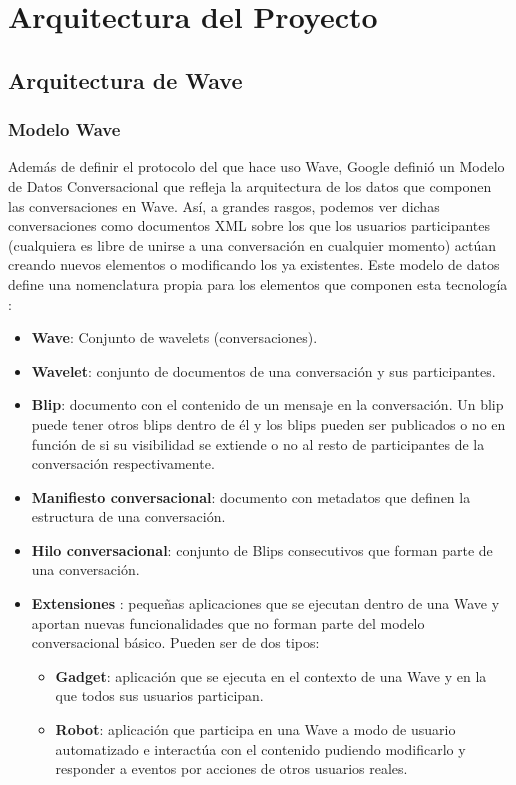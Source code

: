 \newpage
\thispagestyle{sectioned}
\chapter{Arquitectura del Proyecto}

\section{Arquitectura de Wave}

    \subsection{Modelo Wave}\label{sec:waveModel}
    
    Además de definir el protocolo del que hace uso Wave, Google definió un Modelo de Datos Conversacional \cite{ref:wave_conversation_model} que refleja la arquitectura de los datos que componen las conversaciones en Wave. Así, a grandes rasgos, podemos ver dichas conversaciones como documentos XML sobre los que los usuarios participantes (cualquiera es libre de unirse a una conversación en cualquier momento) actúan creando nuevos elementos o modificando los ya existentes. Este modelo de datos define una nomenclatura propia para los elementos que componen esta tecnología \cite{ref:wave_api_overview} \cite{ref:wave_white_paper}:
    
      \begin{itemize}
	\item \textbf{Wave}: Conjunto de wavelets (conversaciones).
	\item \textbf{Wavelet}: conjunto de documentos de una conversación y sus participantes.
	\item \textbf{Blip}: documento con el contenido de un mensaje en la conversación. Un blip puede tener otros blips dentro de él y los blips pueden ser publicados o no en función de si su visibilidad se extiende o no al resto de participantes de la conversación respectivamente.
	\item \textbf{Manifiesto conversacional}: documento con metadatos que definen la estructura de una conversación. 
	\item \textbf{Hilo conversacional}: conjunto de Blips consecutivos que forman parte de una conversación.
	\item \textbf{Extensiones} \cite{ref:wave_extensions}: pequeñas aplicaciones que se ejecutan dentro de una Wave y aportan nuevas funcionalidades que no forman parte del modelo conversacional básico. Pueden ser de dos tipos:
	  \begin{itemize}
	    \item \textbf{Gadget}: aplicación que se ejecuta en el contexto de una Wave y en la que todos sus usuarios participan.
	    \item \textbf{Robot}: aplicación que participa en una Wave a modo de usuario automatizado e interactúa con el contenido pudiendo modificarlo y responder a eventos por acciones de otros usuarios reales.
	  \end{itemize}
      \end{itemize}
      
